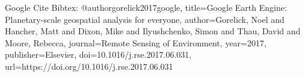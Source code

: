 Google Cite Bibtex:
@author{gorelick2017google,
    title={Google Earth Engine: Planetary-scale geospatial analysis for everyone},
    author={Gorelick, Noel and Hancher, Matt and Dixon, Mike and Ilyushchenko, Simon and Thau, David and Moore, Rebecca},
    journal={Remote Sensing of Environment},
    year={2017},
    publisher={Elsevier},
    doi={10.1016/j.rse.2017.06.031},
    url={https://doi.org/10.1016/j.rse.2017.06.031}
  }

